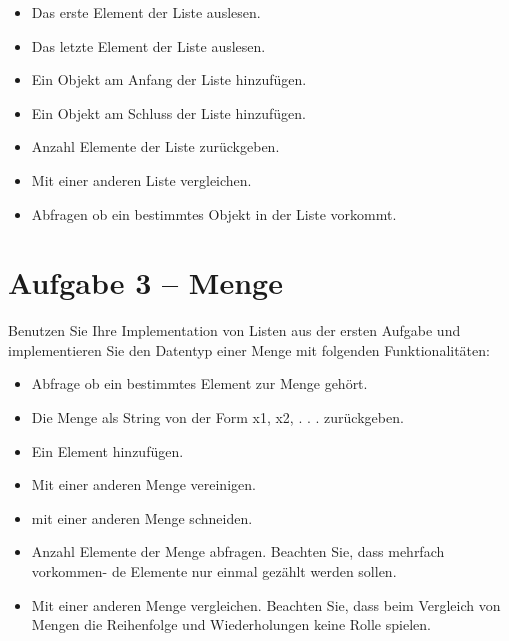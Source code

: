 \begin{itemize}
	\item
		Das erste Element der Liste auslesen.
	\item
		Das letzte Element der Liste auslesen.
	\item
		Ein Objekt am Anfang der Liste hinzufügen.
	\item
		Ein Objekt am Schluss der Liste hinzufügen.
	\item
		Anzahl Elemente der Liste zurückgeben.
	\item
		Mit einer anderen Liste vergleichen.
	\item
		Abfragen ob ein bestimmtes Objekt in der Liste vorkommt.
\end{itemize}




\newpage

\section*{Aufgabe 3 – Menge}
Benutzen Sie Ihre Implementation von Listen aus der ersten Aufgabe und implementieren Sie den Datentyp einer Menge mit folgenden Funktionalitäten:

\begin{itemize}
	\item
		Abfrage ob ein bestimmtes Element zur Menge gehört.
	\item
		Die Menge als String von der Form {x1, x2, . . . } zurückgeben.
	\item
		Ein Element hinzufügen.
	\item
		Mit einer anderen Menge vereinigen.
	\item
		mit einer anderen Menge schneiden.
	\item
		Anzahl Elemente der Menge abfragen. Beachten Sie, dass mehrfach vorkommen- de Elemente nur einmal gezählt werden sollen.
	\item
		Mit einer anderen Menge vergleichen. Beachten Sie, dass beim Vergleich von Mengen die Reihenfolge und Wiederholungen keine Rolle spielen.
		
\end{itemize}

